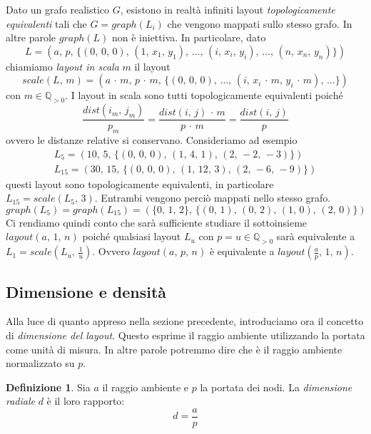 \documentclass[a4paper,11pt]{article}
\theoremstyle{definition}
\newtheorem{definition}{Definizione}
\begin{document}
Dato un grafo realistico $G$, esistono in realtà infiniti layout \emph{topologicamente equivalenti} tali che $G = graph(L_i)$ che vengono mappati sullo stesso grafo. In altre parole $graph(L)$ non è iniettiva. In particolare, dato
\begin{equation*}
L = (a,\,p,\,\{(0,\,0,\,0),\,(1,\,x_1,\,y_1),\,\dots,\,(i,\,x_i,\,y_i),\,\dots,\,(n,\,x_n,\,y_n)\})
\end{equation*}
chiamiamo \emph{layout in scala} $m$ il layout
\begin{equation*}
scale(L,\,m) = (a\,\cdot\,m,\,p\,\cdot\,m,\,\{(0,\,0,\,0),\,\dots,\,(i,\,x_i\,\cdot\,m,\,y_i\,\cdot\,m),\,\dots\})
\end{equation*}
con $m \in \mathbb{Q}_{>0}$. I layout in scala sono tutti topologicamente equivalenti poiché
\begin{equation*}
\frac{dist(i_m,\,j_m)}{p_m} = \frac{dist(i,\,j)\,\cdot\,m}{p\,\cdot\,m} = \frac{dist(i,\,j)}{p}	
\end{equation*}
ovvero le distanze relative si conservano. Consideriamo ad esempio
\begin{align*}
L_5 = (10,\,5,\,\{(0,\,0,\,0),\,(1,\,4,\,1),\,(2,\,-2,\,-3)\})\\
L_{15} = (30,\,15,\,\{(0,\,0,\,0),\,(1,\,12,\,3),\,(2,\,-6,\,-9)\})
\end{align*}
questi layout sono topologicamente equivalenti, in particolare $L_{15} = scale(L_5,\,3)$. Entrambi vengono perciò mappati nello stesso grafo.
\begin{equation*}
graph(L_5) = graph(L_{15}) = (\{0,\,1,\,2\},\,\{(0,\,1),\,(0,\,2),\,(1,\,0),\,(2,\,0)\})
\end{equation*}
Ci rendiamo quindi conto che sarà sufficiente studiare il sottoinsieme $layout(a,\,1,\,n)$ poiché qualsiasi layout $L_u$ con $p=u \in \mathbb{Q}_{>0}$ sarà equivalente a $L_1 = scale(L_u,\,\frac{1}{u})$. Ovvero $layout(a,\,p,\,n)$ è equivalente a $layout(\frac{a}{p},\,1,\,n)$.

\subsection{Dimensione e densità}

Alla luce di quanto appreso nella sezione precedente, introduciamo ora il concetto di \emph{dimensione del layout}. Questo esprime il raggio ambiente utilizzando la portata come unità di misura. In altre parole potremmo dire che è il raggio ambiente normalizzato su $p$.

\begin{definition}
Sia $a$ il raggio ambiente e $p$ la portata dei nodi. La \emph{dimensione radiale} $d$ è il loro rapporto:
\begin{equation*}
d = \frac{a}{p}
\end{equation*}
\end{definition}
\end{document}
